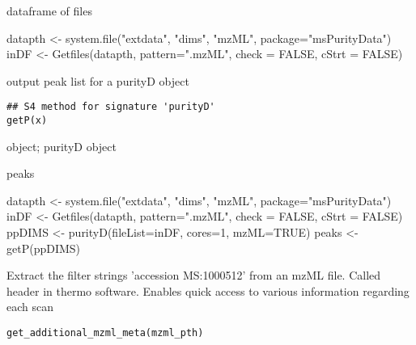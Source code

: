 \documentclass[letterpaper]{book}
\begin{document}
%
\begin{Value}
dataframe of files
\end{Value}
%
\begin{Examples}
\begin{ExampleCode}

datapth <- system.file("extdata", "dims", "mzML", package="msPurityData")
inDF <- Getfiles(datapth, pattern=".mzML", check = FALSE, cStrt = FALSE)
\end{ExampleCode}
\end{Examples}
%
\begin{Description}\relax
output peak list for a purityD object
\end{Description}
%
\begin{Usage}
\begin{verbatim}
## S4 method for signature 'purityD'
getP(x)
\end{verbatim}
\end{Usage}
%
\begin{Arguments}
\begin{ldescription}
\item[\code{x}] object; purityD object
\end{ldescription}
\end{Arguments}
%
\begin{Value}
peaks
\end{Value}
%
\begin{Examples}
\begin{ExampleCode}
datapth <- system.file("extdata", "dims", "mzML", package="msPurityData")
inDF <- Getfiles(datapth, pattern=".mzML", check = FALSE, cStrt = FALSE)
ppDIMS <- purityD(fileList=inDF, cores=1, mzML=TRUE)
peaks <- getP(ppDIMS)
\end{ExampleCode}
\end{Examples}
%
\begin{Description}\relax
Extract the filter strings 'accession MS:1000512' from an mzML file. Called header in thermo software.
Enables quick access to various information regarding each scan
\end{Description}
%
\begin{Usage}
\begin{verbatim}
get_additional_mzml_meta(mzml_pth)
\end{verbatim}
\end{Usage}
\end{document}
